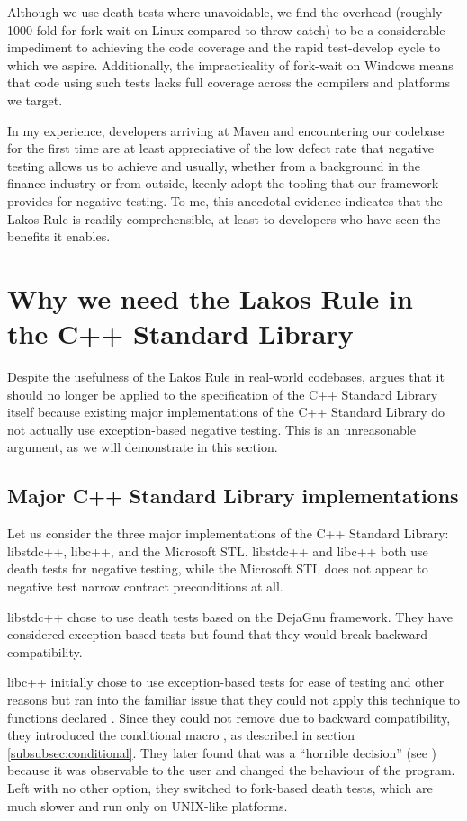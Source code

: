 Although we use death tests where unavoidable, we find the overhead (roughly 1000-fold for fork-wait on Linux compared to throw-catch) to be a considerable impediment to achieving the code coverage and the rapid test-develop cycle to which we aspire. Additionally, the impracticality of fork-wait on Windows means that code using such tests lacks full coverage across the compilers and platforms we target.

In my experience, developers arriving at Maven and encountering our codebase for the first time are at least appreciative of the low defect rate that negative testing allows us to achieve and usually, whether from a background in the finance industry or from outside, keenly adopt the tooling that our framework provides for negative testing. To me, this anecdotal evidence indicates that the Lakos Rule is readily comprehensible, at least to developers who have seen the benefits it enables.

\section{Why we need the Lakos Rule in the C++ Standard Library}
\label{sec:stdlib}

Despite the usefulness of the Lakos Rule in real-world codebases, \cite{P1656R2} argues that it should no longer be applied to the specification of the C++ Standard Library itself because existing major implementations of the C++ Standard Library do not actually use exception-based negative testing. This is an unreasonable argument, as we will demonstrate in this section.

\subsection{Major C++ Standard Library implementations}
\label{subsec:major}

Let us consider the three major implementations of the C++ Standard Library: libstdc++, libc++, and the Microsoft STL. libstdc++ and libc++ both use death tests for negative testing, while the Microsoft STL does not appear to negative test narrow contract preconditions at all.

libstdc++ chose to use death tests based on the DejaGnu framework. They have considered exception-based tests but found that they would break backward compatibility.

libc++ initially chose to use exception-based tests for ease of testing and other reasons but ran into the familiar issue that they could not apply this technique to functions declared . Since they could not remove  due to backward compatibility, they introduced the conditional  macro  , as described in section \ref{subsubsec:conditional}. They later found that  was a ``horrible decision'' (see \cite{LLVMReviewD59166}) because it was observable to the user and changed the behaviour of the program. Left with no other option, they switched to fork-based death tests, which are much slower and run only on UNIX-like platforms.

